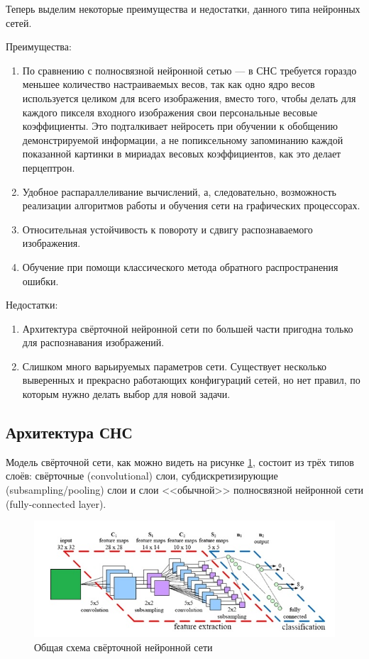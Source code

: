 \documentclass[14pt]{article}
\numberwithin{figure}{section}
\numberwithin{equation}{section}
\begin{document}
Теперь выделим некоторые преимущества и недостатки, данного типа нейронных сетей.

Преимущества:
\begin{enumerate}
	\item
	По сравнению с полносвязной нейронной сетью — в СНС требуется гораздо меньшее количество настраиваемых весов, так как одно ядро весов используется целиком для всего изображения, вместо того, чтобы делать для каждого пикселя входного изображения свои персональные весовые коэффициенты. Это подталкивает нейросеть при обучении к обобщению демонстрируемой информации, а не попиксельному запоминанию каждой показанной картинки в мириадах весовых коэффициентов, как это делает перцептрон.
	\item
	Удобное распараллеливание вычислений, а, следовательно, возможность реализации алгоритмов работы и обучения сети на графических процессорах.
	\item
	Относительная устойчивость к повороту и сдвигу распознаваемого изображения.
	\item
	Обучение при помощи классического метода обратного распространения ошибки.
\end{enumerate}

Недостатки:
\begin{enumerate}
	\item
	Архитектура свёрточной нейронной сети по большей части пригодна только для распознавания изображений.
	\item
	Слишком много варьируемых параметров сети. Существует несколько выверенных и прекрасно работающих конфигураций сетей, но нет правил, по которым нужно делать выбор для новой задачи.
\end{enumerate}

\subsection{Архитектура СНС}

Модель свёрточной сети, как можно видеть на рисунке \ref{ris:6}, состоит из трёх типов слоёв: свёрточные (convolutional) слои, субдискретизирующие (subsampling/pooling) слои и слои <<обычной>> полносвязной нейронной сети (fully-connected layer).

\begin{figure}[h]
	\begin{center}
		\includegraphics[scale=0.99] {6.JPG}
		\caption{Общая схема свёрточной нейронной сети}
		\label{ris:6}
	\end{center}
\end{figure}
\end{document}
